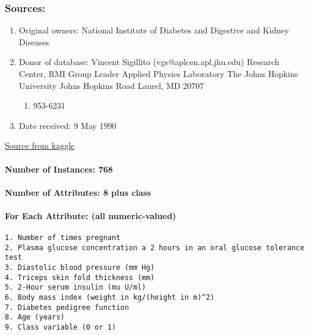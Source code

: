 \documentclass[11pt]{article}
\providecommand{\tightlist}{%
      \setlength{\itemsep}{0pt}\setlength{\parskip}{0pt}}
\begin{document}
\hypertarget{sources}{%
\subsubsection{Sources:}\label{sources}}

\begin{enumerate}
\def\labelenumi{(\alph{enumi})}
\item
  Original owners: National Institute of Diabetes and Digestive and
  Kidney Diseases
\item
  Donor of database: Vincent Sigillito (vgs@aplcen.apl.jhu.edu) Research
  Center, RMI Group Leader Applied Physics Laboratory The Johns Hopkins
  University Johns Hopkins Road Laurel, MD 20707

  \begin{enumerate}
  \def\labelenumii{(\arabic{enumii})}
  \setcounter{enumii}{300}
  \tightlist
  \item
    953-6231
  \end{enumerate}
\item
  Date received: 9 May 1990
\end{enumerate}

\href{https://www.kaggle.com/datasets/mathchi/diabetes-data-set}{Source
from kaggle}

    \hypertarget{number-of-instances-768}{%
\paragraph{Number of Instances: 768}\label{number-of-instances-768}}

\hypertarget{number-of-attributes-8-plus-class}{%
\paragraph{Number of Attributes: 8 plus
class}\label{number-of-attributes-8-plus-class}}

\hypertarget{for-each-attribute-all-numeric-valued}{%
\paragraph{For Each Attribute: (all
numeric-valued)}\label{for-each-attribute-all-numeric-valued}}

\begin{verbatim}
1. Number of times pregnant
2. Plasma glucose concentration a 2 hours in an oral glucose tolerance test
3. Diastolic blood pressure (mm Hg)
4. Triceps skin fold thickness (mm)
5. 2-Hour serum insulin (mu U/ml)
6. Body mass index (weight in kg/(height in m)^2)
7. Diabetes pedigree function
8. Age (years)
9. Class variable (0 or 1)
\end{verbatim}
\end{document}
